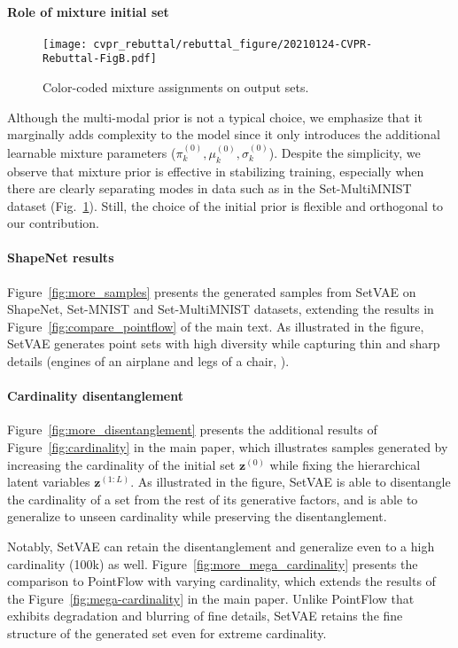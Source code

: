 \documentclass[final]{arxiv/cvpr}
\begin{document}
\paragraph{Role of mixture initial set}
\begin{figure}[!t]
    \centering
    \texttt{[image: cvpr\_rebuttal/rebuttal\_figure/20210124-CVPR-Rebuttal-FigB.pdf]}
    \caption{Color-coded mixture assignments on output sets.}
\label{fig:mog_attention}
\end{figure}
Although the multi-modal prior is not a typical choice, we emphasize that it marginally adds complexity to the model since it only introduces the additional learnable mixture parameters ($\pi_k^{(0)},\mu_k^{(0)},\sigma_k^{(0)}$).
Despite the simplicity, we observe that mixture prior is effective in stabilizing training, especially when there are clearly separating modes in data such as in the Set-MultiMNIST dataset (Fig.~\ref{fig:mog_attention}).
Still, the choice of the initial prior is flexible and orthogonal to our contribution.

\paragraph{ShapeNet results}
Figure~\ref{fig:more_samples} presents the generated samples from SetVAE on ShapeNet, Set-MNIST and Set-MultiMNIST datasets, extending the results in Figure~\ref{fig:compare_pointflow} of the main text.
As illustrated in the figure, SetVAE generates point sets with high diversity while capturing thin and sharp details (\eg engines of an airplane and legs of a chair, \etc).
\paragraph{Cardinality disentanglement}
Figure~\ref{fig:more_disentanglement} presents the additional results of Figure~\ref{fig:cardinality} in the main paper, which illustrates samples generated by increasing the cardinality of the initial set $\mathbf{z}^{(0)}$ while fixing the hierarchical latent variables $\mathbf{z}^{(1:L)}$.
As illustrated in the figure, SetVAE is able to disentangle the cardinality of a set from the rest of its generative factors, and is able to generalize to unseen cardinality while preserving the disentanglement.

Notably, SetVAE can retain the disentanglement and generalize even to a high cardinality (100k) as well.
Figure~\ref{fig:more_mega_cardinality} presents the comparison to PointFlow with varying cardinality, which extends the results of the Figure~\ref{fig:mega-cardinality} in the main paper.
Unlike PointFlow that exhibits degradation and blurring of fine details, SetVAE retains the fine structure of the generated set even for extreme cardinality.
\end{document}
